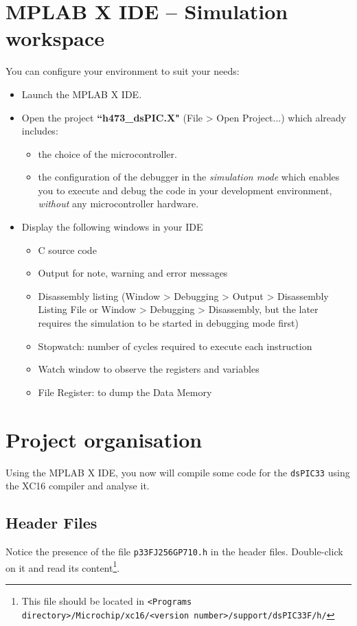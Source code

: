 \documentclass[10pt,a4paper]{article}
\theoremstyle{definition}%
\newcommand{\kw}[1]{\texttt{#1}}
\begin{document}
\section{MPLAB X IDE -- Simulation workspace}
You can configure your environment to suit your needs:
\begin{itemize}
\item Launch the MPLAB X IDE.
\item Open the project \textbf{``h473\_dsPIC.X"} (File > Open Project...) which already includes:
\begin{itemize}
	 \item the choice of the microcontroller.
	 \item the configuration of the debugger in the \textit{simulation mode} which enables you to execute and debug the code in your development environment, \textit{without} any microcontroller hardware.
 \end{itemize}

\item Display the following windows in your IDE
\begin{itemize}
	\item C source code
	\item Output for note, warning and error messages
	\item Disassembly listing (Window > Debugging > Output > Disassembly Listing File or Window > Debugging > Disassembly, but the later requires the simulation to be started in debugging mode first)
	\item Stopwatch: number of cycles required to execute each instruction
	\item Watch window to observe the registers and variables
	\item File Register: to dump the Data Memory
\end{itemize}
\end{itemize}




\section{Project organisation}
Using the MPLAB X IDE, you now will compile some code for the \kw{dsPIC33} using the XC16 compiler and analyse it. %
\subsection{ Header Files}
Notice the presence of the file \kw{p33FJ256GP710.h} in the header files. Double-click on it and read its content\footnote{This file should be located in \texttt{<Programs directory>/Microchip/xc16/<version number>/support/dsPIC33F/h/}}.
\end{document}
